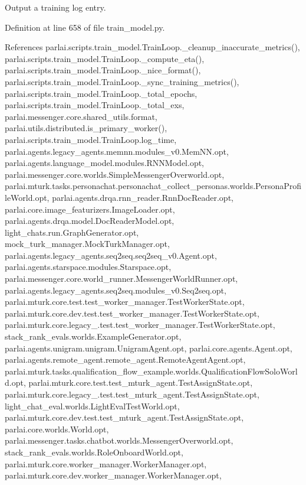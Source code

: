 \begin{DoxyVerb}Output a training log entry.\end{DoxyVerb}
 

Definition at line 658 of file train\+\_\+model.\+py.



References parlai.\+scripts.\+train\+\_\+model.\+Train\+Loop.\+\_\+cleanup\+\_\+inaccurate\+\_\+metrics(), parlai.\+scripts.\+train\+\_\+model.\+Train\+Loop.\+\_\+compute\+\_\+eta(), parlai.\+scripts.\+train\+\_\+model.\+Train\+Loop.\+\_\+nice\+\_\+format(), parlai.\+scripts.\+train\+\_\+model.\+Train\+Loop.\+\_\+sync\+\_\+training\+\_\+metrics(), parlai.\+scripts.\+train\+\_\+model.\+Train\+Loop.\+\_\+total\+\_\+epochs, parlai.\+scripts.\+train\+\_\+model.\+Train\+Loop.\+\_\+total\+\_\+exs, parlai.\+messenger.\+core.\+shared\+\_\+utils.\+format, parlai.\+utils.\+distributed.\+is\+\_\+primary\+\_\+worker(), parlai.\+scripts.\+train\+\_\+model.\+Train\+Loop.\+log\+\_\+time, parlai.\+agents.\+legacy\+\_\+agents.\+memnn.\+modules\+\_\+v0.\+Mem\+N\+N.\+opt, parlai.\+agents.\+language\+\_\+model.\+modules.\+R\+N\+N\+Model.\+opt, parlai.\+messenger.\+core.\+worlds.\+Simple\+Messenger\+Overworld.\+opt, parlai.\+mturk.\+tasks.\+personachat.\+personachat\+\_\+collect\+\_\+personas.\+worlds.\+Persona\+Profile\+World.\+opt, parlai.\+agents.\+drqa.\+rnn\+\_\+reader.\+Rnn\+Doc\+Reader.\+opt, parlai.\+core.\+image\+\_\+featurizers.\+Image\+Loader.\+opt, parlai.\+agents.\+drqa.\+model.\+Doc\+Reader\+Model.\+opt, light\+\_\+chats.\+run.\+Graph\+Generator.\+opt, mock\+\_\+turk\+\_\+manager.\+Mock\+Turk\+Manager.\+opt, parlai.\+agents.\+legacy\+\_\+agents.\+seq2seq.\+seq2seq\+\_\+v0.\+Agent.\+opt, parlai.\+agents.\+starspace.\+modules.\+Starspace.\+opt, parlai.\+messenger.\+core.\+world\+\_\+runner.\+Messenger\+World\+Runner.\+opt, parlai.\+agents.\+legacy\+\_\+agents.\+seq2seq.\+modules\+\_\+v0.\+Seq2seq.\+opt, parlai.\+mturk.\+core.\+test.\+test\+\_\+worker\+\_\+manager.\+Test\+Worker\+State.\+opt, parlai.\+mturk.\+core.\+dev.\+test.\+test\+\_\+worker\+\_\+manager.\+Test\+Worker\+State.\+opt, parlai.\+mturk.\+core.\+legacy\+\_.\+test.\+test\+\_\+worker\+\_\+manager.\+Test\+Worker\+State.\+opt, stack\+\_\+rank\+\_\+evals.\+worlds.\+Example\+Generator.\+opt, parlai.\+agents.\+unigram.\+unigram.\+Unigram\+Agent.\+opt, parlai.\+core.\+agents.\+Agent.\+opt, parlai.\+agents.\+remote\+\_\+agent.\+remote\+\_\+agent.\+Remote\+Agent\+Agent.\+opt, parlai.\+mturk.\+tasks.\+qualification\+\_\+flow\+\_\+example.\+worlds.\+Qualification\+Flow\+Solo\+World.\+opt, parlai.\+mturk.\+core.\+test.\+test\+\_\+mturk\+\_\+agent.\+Test\+Assign\+State.\+opt, parlai.\+mturk.\+core.\+legacy\+\_.\+test.\+test\+\_\+mturk\+\_\+agent.\+Test\+Assign\+State.\+opt, light\+\_\+chat\+\_\+eval.\+worlds.\+Light\+Eval\+Test\+World.\+opt, parlai.\+mturk.\+core.\+dev.\+test.\+test\+\_\+mturk\+\_\+agent.\+Test\+Assign\+State.\+opt, parlai.\+core.\+worlds.\+World.\+opt, parlai.\+messenger.\+tasks.\+chatbot.\+worlds.\+Messenger\+Overworld.\+opt, stack\+\_\+rank\+\_\+evals.\+worlds.\+Role\+Onboard\+World.\+opt, parlai.\+mturk.\+core.\+worker\+\_\+manager.\+Worker\+Manager.\+opt, parlai.\+mturk.\+core.\+dev.\+worker\+\_\+manager.\+Worker\+Manager.\+opt, 
